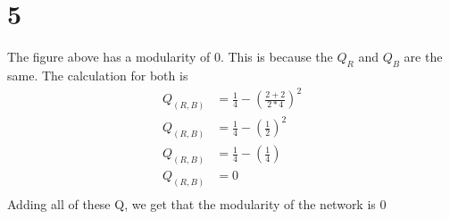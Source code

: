 \documentclass[12pt,english]{article}
\begin{document}
\section*{5} 
\begin{figure}[!h]
\centering
{} 
\end{figure}
The figure above has a modularity of 0. This is because the $Q_R$ and $Q_B$ are the same. The calculation for both is \\
\begin{align*}
Q_{(R,B)} &= \frac{1}{4} - \left( \frac{2+2}{2 * 4}\right)^2\\
Q_{(R,B)} &= \frac{1}{4} - \left( \frac{1}{2} \right)^2\\
Q_{(R,B)} &= \frac{1}{4} - \left( \frac{1}{4} \right)\\
Q_{(R,B)} &= 0\\
\end{align*}
Adding all of these Q, we get that the modularity of the network is 0
\end{document}
